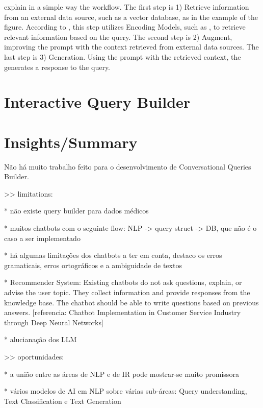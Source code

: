 \citet{gao_retrieval-augmented_2023} explain in a simple way the workflow. The first step is 1) Retrieve information from an external data source, such as a vector database, as in the example of the figure. According to \citet{gao_retrieval-augmented_2023}, this step utilizes Encoding Models, such as {\bm}, to retrieve relevant information based on the query. The second step is 2) Augment, improving the {\llm} prompt with the context retrieved from external data sources. The last step is 3) Generation. Using the prompt with the retrieved context, the {\llm} generates a response to the query.




\section{Interactive Query Builder}




\section{Insights/Summary}

Não há muito trabalho feito para o desenvolvimento de Conversational Queries Builder.

>> limitations: 

* não existe query builder para dados médicos

* muitos chatbots com o seguinte flow: NLP -> query struct -> DB, que não é o caso a ser implementado

* há algumas limitações dos chatbots a ter em conta, destaco os erros gramaticais, erros ortográficos e a ambiguidade de textos

* Recommender System: Existing chatbots do not ask questions, explain, or advise the user topic. They collect information and provide responses from the knowledge base. The chatbot should be able to write questions based on previous answers. [referencia: Chatbot Implementation in Customer Service Industry through Deep Neural Networks]

* alucianação dos LLM

>> oportunidades:

* a união entre as áreas de NLP e de IR pode mostrar-se muito promissora

* vários modelos de AI em NLP sobre várias sub-áreas: Query understanding, Text Classification e Text Generation